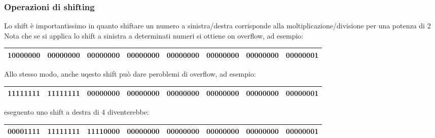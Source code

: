 \subsubsection*{Operazioni di shifting}
Lo shift è importantissimo in quanto shiftare un numero a sinistra/destra corrisponde alla moltiplicazione/divisione per una potenza di 2
Nota che se si applica lo shift a sinistra a determinati numeri si ottiene on overflow, ad esempio:
\begin{center}
	\begin{footnotesize}
		\begin{tabular}{|c c c c c c c c|}
			\hline
			10000000 & 00000000 & 00000000 & 00000000 & 00000000 & 00000000 & 00000000 & 00000001 \\
			\hline
		\end{tabular}
  \end{footnotesize}%
\end{center}
Allo stesso modo, anche uqesto shift può dare peroblemi di overflow, ad esempio:
\begin{center}
	\begin{footnotesize}
		\begin{tabular}{|c c c c c c c c|}
			\hline
			11111111 & 11111111 & 00000000 & 00000000 & 00000000 & 00000000 & 00000000 & 00000001 \\
			\hline
		\end{tabular}
  \end{footnotesize}%
\end{center}
eseguento uno shift a destra di 4 diventerebbe:
\begin{center}
	\begin{footnotesize}
		\begin{tabular}{|c c c c c c c c|}
			\hline
			00001111 & 11111111 & 11110000 & 00000000 & 00000000 & 00000000 & 00000000 & 00000001 \\
			\hline
		\end{tabular}
  \end{footnotesize}%
\end{center}
